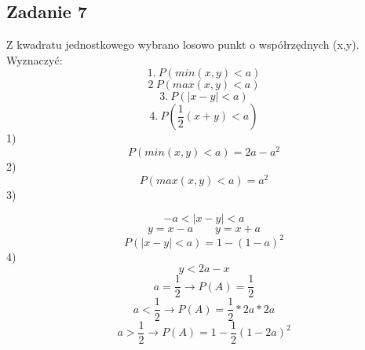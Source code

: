 \subsection{Zadanie 7}

Z kwadratu jednostkowego wybrano losowo punkt o współrzędnych (x,y). Wyznaczyć:
$$
1. \ P(min(x,y) <a)
$$
$$
2 \ P(max(x,y) < a)
$$
$$
3. \ P(|x-y| < a)
$$
$$
4. \ P(\frac{1}{2}(x+y) < a)
$$
1)
$$
P(min(x,y) <a) =  2a-a^2
$$
2)
$$
P(max(x,y) < a) = a^2
$$
3)

$$
-a<|x-y|<a
$$
$$
y = x-a  \  \  \  \  \  \  \  \  \ y = x+ a
$$
$$
 P(|x-y| < a)  = 1 - (1-a)^2
$$
4)
$$
y < 2a -x
$$
$$
a = \frac{1}{2} \longrightarrow P(A) = \frac{1}{2}
$$
$$
a < \frac{1}{2} \longrightarrow P(A) = \frac{1}{2} * 2a *2a
$$
$$
a > \frac{1}{2} \longrightarrow P(A) = 1 - \frac{1}{2} (1-2a)^2
$$

